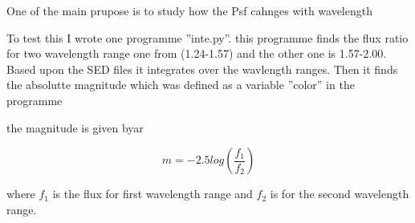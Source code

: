 \clearpage

One of the main prupose is to study how the Psf cahnges with wavelength

To test this I wrote one programme ''inte.py''. this programme finds the flux ratio for two wavelength range one from (1.24-1.57) and
the other one is 1.57-2.00. Based upon the SED files it integrates over the wavlength ranges. Then it finds the absolutte magnitude which
was defined as a variable ''color'' in the programme

the magnitude is given byar

\begin{equation}
 m = -2.5 log(\frac{f_1}{f_2})
\end{equation}

where $f_1$ is the flux for first wavelength range and $f_2$ is for the second wavelength range.
